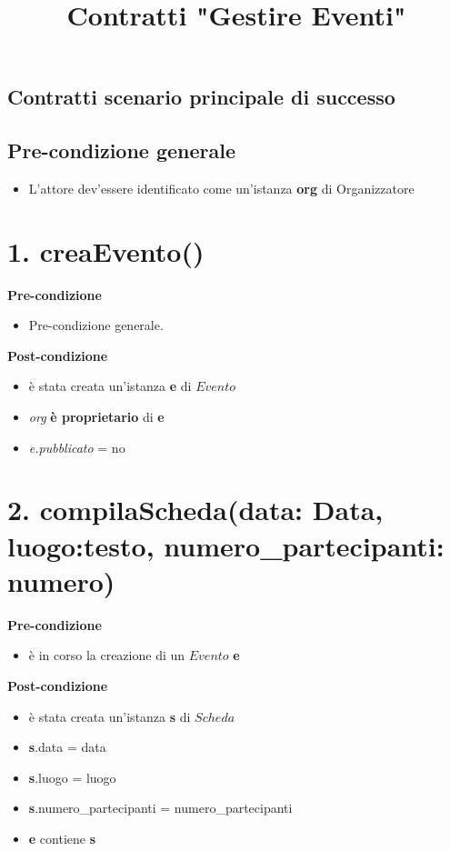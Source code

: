 \documentclass[12pt]{extarticle}
\begin{document}
\title{Contratti "Gestire Eventi"}
\date{}
\maketitle


\begin{center}
  \section*{Contratti scenario principale di successo}
\end{center}

\subsection*{Pre-condizione generale}

\begin{itemize}
  \item L'attore dev'essere identificato come un'istanza \textbf{org} di Organizzatore
\end{itemize}

\section*{1. creaEvento()}

\textbf{Pre-condizione}
\begin{itemize}
  \item Pre-condizione generale.
\end{itemize}
\textbf{Post-condizione}
\begin{itemize}
  \item è stata creata un'istanza \textbf{e} di $Evento$
  \item \textit{org} \textbf{è proprietario} di \textbf{e}
  \item \textit{e.pubblicato} = no
\end{itemize}


\section*{2. compilaScheda(data: Data, luogo:testo, numero\_partecipanti: numero)}

\textbf{Pre-condizione}
\begin{itemize}
  \item è in corso la creazione di un $Evento$ \textbf{e}
\end{itemize} 
\textbf{Post-condizione} 
\begin{itemize}
  \item è stata creata un'istanza \textbf{s} di $Scheda$
  \item \textbf{s}.data = data
  \item \textbf{s}.luogo = luogo
  \item \textbf{s}.numero\_partecipanti = numero\_partecipanti
  \item \textbf{e} contiene \textbf{s}
\end{itemize}
\end{document}
